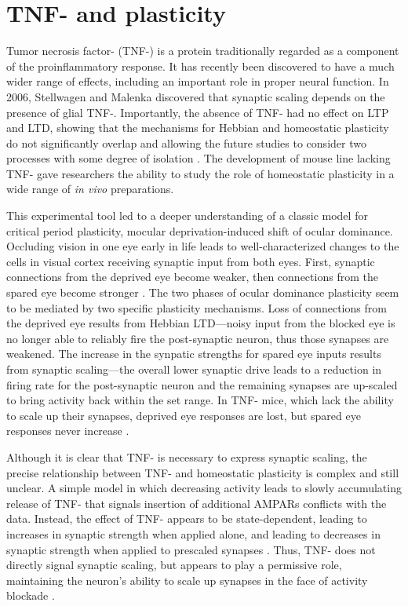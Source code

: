 \section{TNF-\textalpha{} and plasticity}

Tumor necrosis factor-\textalpha{} (TNF-\textalpha{}) is a protein traditionally regarded as a component of the proinflammatory response. It has recently been discovered to have a much wider range of effects, including an important role in proper neural function. In 2006, Stellwagen and Malenka discovered that synaptic scaling depends on the presence of glial TNF-\textalpha{}. Importantly, the absence of TNF-\textalpha{} had no effect on LTP and LTD, showing that the mechanisms for Hebbian and homeostatic plasticity do not significantly overlap and allowing the future studies to consider two processes with some degree of isolation \cite{Stellwagen2006}. The development of mouse line lacking TNF-\textalpha{} gave researchers the ability to study the role of homeostatic plasticity in a wide range of \textit{in vivo} preparations.

This experimental tool led to a deeper understanding of a classic model for critical period plasticity, mocular deprivation-induced shift of ocular dominance. Occluding vision in one eye early in life leads to well-characterized changes to the cells in visual cortex receiving synaptic input from both eyes. First, synaptic connections from the deprived eye become weaker, then connections from the spared eye become stronger \cite{Frenkel2004}. The two phases of ocular dominance plasticity seem to be mediated by two specific plasticity mechanisms. Loss of connections from the deprived eye results from Hebbian LTD---noisy input from the blocked eye is no longer able to reliably fire the post-synaptic neuron, thus those synapses are weakened. The increase in the synpatic strengths for spared eye inputs results from synaptic scaling---the overall lower synaptic drive leads to a reduction in firing rate for the post-synaptic neuron and the remaining synapses are up-scaled to bring activity back within the set range. In TNF-\textalpha{} mice, which lack the ability to scale up their synapses, deprived eye responses are lost, but spared eye responses never increase \cite{Kaneko2008}.

Although it is clear that TNF-\textalpha{} is necessary to express synaptic scaling, the precise relationship between TNF-\textalpha{} and homeostatic plasticity is complex and still unclear. A simple model in which decreasing activity leads to slowly accumulating release of TNF-\textalpha{} that signals insertion of additional AMPARs conflicts with the data. Instead, the effect of TNF-\textalpha{} appears to be state-dependent, leading to increases in synaptic strength when applied alone, and leading to decreases in synaptic strength when applied to prescaled synapses \cite{Steinmetz2010}. Thus, TNF-\textalpha{} does not directly signal synaptic scaling, but appears to play a permissive role, maintaining the neuron's ability to scale up synapses in the face of activity blockade \cite{Steinmetz2010}.

